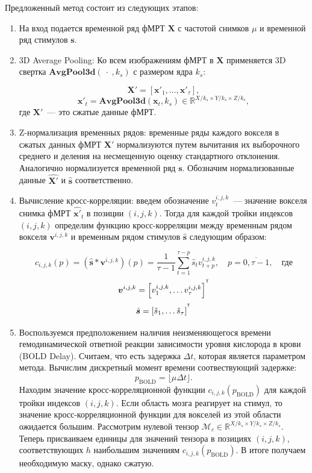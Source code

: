 \documentclass[a4paper, 12pt]{extarticle}
\begin{document}
Предложенный метод состоит из следующих этапов:
\begin{enumerate}
    \item На вход подается временной ряд фМРТ $\bm{X}$ с частотой снимков $\mu$ и временной ряд стимулов $\bm{s}$.
    \item 3D Average Pooling: Ко всем изображениям фМРТ в $\bm{X}$ применяется 3D свертка $\textbf{AvgPool3d}(~\cdot~,  k_s)$ с размером ядра $k_s$:

    \begin{equation*}
    \bm{X}' = \left[\bm{x}'_1, \dots, \bm{x}'_{\tau}\right],
    \end{equation*}
    \begin{equation*}
    \bm{x}'_t = \textbf{AvgPool3d}(\bm{x}_t, k_s) \in \mathbb{R}^{X/ k_s \times Y/ k_s \times Z/ k_s}, 
    \end{equation*}
    где $\bm{X}'$~--- это сжатые данные фМРТ.
    \item Z-нормализация временных рядов: временные ряды каждого вокселя в сжатых данных фМРТ $\bm{X}'$ нормализуются путем вычитания их выборочного среднего и деления на несмещенную оценку стандартного отклонения. 
	Аналогично нормализуется временной ряд $\bm{s}$. 
	Обозначим нормализованные данные $\hat{\bm{X}'}$ и $\hat{\bm{s}}$ соответственно. 


    \item Вычисление кросс-корреляции: введем обозначение $v^{i,j,k}_t$~--- значение вокселя снимка фМРТ $\hat{\bm{x}'}_t$ в позиции $(i,j,k)$. Тогда для каждой тройки индексов $(i,j,k)$ определим функцию кросс-корреляции между временным рядом вокселя $\bm{v}^{i,j,k}$ и временным рядом стимулов $\hat{\bm{s}}$ следующим образом:
    
    \begin{equation*}
        c_{i,j,k}(p) = \left(\hat{\bm{s}} * \bm{v}^{i,j,k}\right)(p)=\dfrac{1}{\tau-1}\sum_{t=1}^{\tau-p} \hat{s}_{t}v^{i,j,k}_{t+p}, \quad p = \overline{0, \tau-1},\quad \text{где}
    \end{equation*}
        $$\bm{v}^{i,j,k}=\left[v^{i,j,k}_1, \dots v^{i,j,k}_{\tau}\right]^{^{\mathsf{T}}}$$
        $$\hat{\bm{s}} = \left[\hat{s}_1, \dots \hat{s}_{\tau}\right]^{^{\mathsf{T}}}$$ 


    \item Воспользуемся предположением наличия неизменяющегося времени гемодинамической ответной реакции зависимости уровня кислорода в крови (BOLD Delay). Считаем, что есть задержка $\Delta t$, которая является параметром метода. Вычислим дискретный момент времени соотвествующий задержке:
    $$p_{\text{BOLD}} = \lfloor\mu\Delta t \rfloor.$$
    Находим значение кросс-корреляционной функции $c_{i,j,k}(p_{\text{BOLD}})$ для каждой тройки индексов $(i,j,k)$. 
	Если область мозга реагирует на стимул, то значение кросс-корреляционной функции для вокселей из этой области ожидается большим.
	Рассмотрим нулевой тензор $\mathcal{M}_c \in \mathbb{R}^{X/ k_s \times Y/ k_s \times Z/ k_s}$.
	Теперь присваиваем единицы для значений тензора в позициях $(i,j,k)$, соответствующих $h$ наибольшим значениям $c_{i,j,k}(p_{\text{BOLD}})$. В итоге получаем необходимую маску, однако сжатую.


\end{enumerate}
\end{document}
